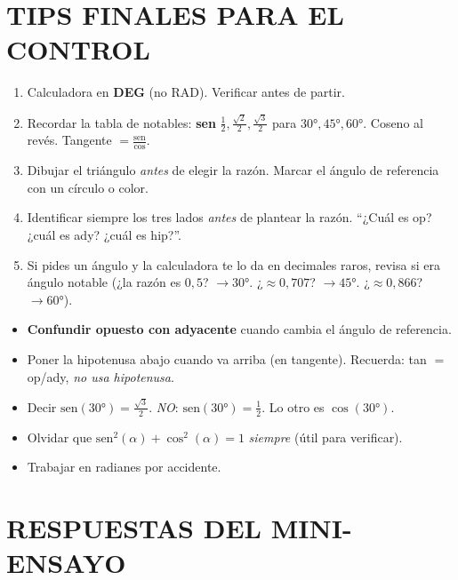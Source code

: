\documentclass[11pt,a4paper]{article}
\begin{document}
\section*{TIPS FINALES PARA EL CONTROL}

\begin{tcolorbox}[tip, title={\color{rojo} CHECKLIST 5 MIN ANTES DEL CONTROL}]
\begin{enumerate}[nosep]
  \item Calculadora en \textbf{DEG} (no RAD). Verificar antes de partir.
  \item Recordar la tabla de notables: \textbf{sen} $\frac{1}{2}, \frac{\sqrt{2}}{2}, \frac{\sqrt{3}}{2}$ para $30°, 45°, 60°$. Coseno al revés. Tangente $= \frac{\mathrm{sen}}{\cos}$.
  \item Dibujar el triángulo \emph{antes} de elegir la razón. Marcar el ángulo de referencia con un círculo o color.
  \item Identificar siempre los tres lados \emph{antes} de plantear la razón. ``¿Cuál es op? ¿cuál es ady? ¿cuál es hip?''.
  \item Si pides un ángulo y la calculadora te lo da en decimales raros, revisa si era ángulo notable (¿la razón es $0{,}5$? $\to 30°$. ¿$\approx 0{,}707$? $\to 45°$. ¿$\approx 0{,}866$? $\to 60°$).
\end{enumerate}
\end{tcolorbox}

\begin{tcolorbox}[propiedad, title=ERRORES TÍPICOS]
\begin{itemize}[nosep]
  \item \textbf{Confundir opuesto con adyacente} cuando cambia el ángulo de referencia.
  \item Poner la hipotenusa abajo cuando va arriba (en tangente). Recuerda: tan $=$ op/ady, \emph{no usa hipotenusa}.
  \item Decir $\mathrm{sen}(30°) = \frac{\sqrt{3}}{2}$. \emph{NO}: $\mathrm{sen}(30°) = \frac{1}{2}$. Lo otro es $\cos(30°)$.
  \item Olvidar que $\mathrm{sen}^{2}(\alpha) + \cos^{2}(\alpha) = 1$ \emph{siempre} (útil para verificar).
  \item Trabajar en radianes por accidente.
\end{itemize}
\end{tcolorbox}

\section*{RESPUESTAS DEL MINI-ENSAYO}
\end{document}
